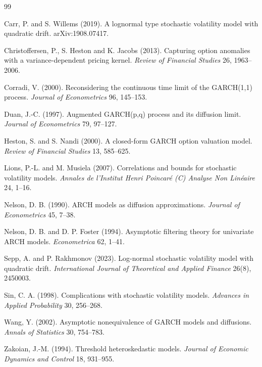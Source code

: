 \documentclass[11pt]{article}
\theoremstyle{remark}
\begin{document}
\begin{thebibliography}{99}

Carr, P. and S. Willems (2019).
A lognormal type stochastic volatility model with quadratic drift.
arXiv:1908.07417.

Christoffersen, P., S. Heston and K. Jacobs (2013).
Capturing option anomalies with a variance-dependent pricing kernel.
\textit{Review of Financial Studies} 26, 1963--2006.

Corradi, V. (2000).
Reconsidering the continuous time limit of the GARCH(1,1) process.
\textit{Journal of Econometrics} 96, 145--153.

Duan, J.-C. (1997).
Augmented GARCH(p,q) process and its diffusion limit.
\textit{Journal of Econometrics} 79, 97--127.

Heston, S. and S. Nandi (2000).
A closed-form GARCH option valuation model.
\textit{Review of Financial Studies} 13, 585--625.

Lions, P.-L. and M. Musiela (2007).
Correlations and bounds for stochastic volatility models.
\textit{Annales de l'Institut Henri Poincar\'e (C) Analyse Non Lin\'eaire}
24, 1--16.

Nelson, D. B. (1990).
ARCH models as diffusion approximations.
\textit{Journal of Econometrics} 45, 7--38.

Nelson, D. B. and D. P. Foster (1994).
Asymptotic filtering theory for univariate ARCH models.
\textit{Econometrica} 62, 1--41.

Sepp, A. and P. Rakhmonov (2023).
Log-normal stochastic volatility model with quadratic drift.
\textit{International Journal of Theoretical and Applied Finance} 26(8),
2450003.

Sin, C. A. (1998).
Complications with stochastic volatility models.
\textit{Advances in Applied Probability} 30, 256--268.

Wang, Y. (2002).
Asymptotic nonequivalence of GARCH models and diffusions.
\textit{Annals of Statistics} 30, 754--783.

Zakoian, J.-M. (1994).
Threshold heteroskedastic models.
\textit{Journal of Economic Dynamics and Control} 18, 931--955.

\end{thebibliography}
\end{document}
